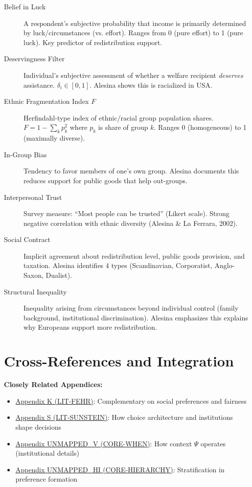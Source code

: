 \begin{description}

\item[Belief in Luck] A respondent's subjective probability that income is primarily determined by luck/circumstances (vs. effort). Ranges from 0 (pure effort) to 1 (pure luck). Key predictor of redistribution support.

\item[Deservingness Filter] Individual's subjective assessment of whether a welfare recipient \textit{deserves} assistance. $\delta_i \in [0,1]$. Alesina shows this is racialized in USA.

\item[Ethnic Fragmentation Index $F$] Herfindahl-type index of ethnic/racial group population shares. $F = 1 - \sum_k p_k^2$ where $p_k$ is share of group $k$. Ranges 0 (homogeneous) to 1 (maximally diverse).

\item[In-Group Bias] Tendency to favor members of one's own group. Alesina documents this reduces support for public goods that help out-groups.

\item[Interpersonal Trust] Survey measure: ``Most people can be trusted'' (Likert scale). Strong negative correlation with ethnic diversity (Alesina \& La Ferrara, 2002).

\item[Social Contract] Implicit agreement about redistribution level, public goods provision, and taxation. Alesina identifies 4 types (Scandinavian, Corporatist, Anglo-Saxon, Dualist).

\item[Structural Inequality] Inequality arising from circumstances beyond individual control (family background, institutional discrimination). Alesina emphasizes this explains why Europeans support more redistribution.

\end{description}

\section{Cross-References and Integration}
\label{sec:alesina-crossref}

\textbf{Closely Related Appendices:}

\begin{itemize}
\item \hyperref[app:lit-fehr]{Appendix K (LIT-FEHR)}: Complementary on social preferences and fairness
\item \hyperref[app:lit-sunstein]{Appendix S (LIT-SUNSTEIN)}: How choice architecture and institutions shape decisions
\item \hyperref[app:context-dimension]{Appendix UNMAPPED_V (CORE-WHEN)}: How context $\Psi$ operates (institutional details)
\item \hyperref[app:hierarchy]{Appendix UNMAPPED_HI (CORE-HIERARCHY)}: Stratification in preference formation
\end{itemize}

